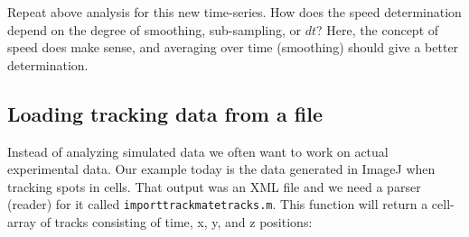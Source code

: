 Repeat above analysis for this new time-series.
How does the speed determination depend on the degree of smoothing, sub-sampling, or $dt$?
Here, the concept of speed does make sense, and averaging over time (smoothing) should give a better determination.

\subsection{Loading tracking data from a file}
Instead of analyzing simulated data we often want to work on actual experimental data.
Our example today is the data generated in ImageJ when tracking spots in cells.
That output was an XML file and we need a parser (reader) for it called \lstinline{importtrackmatetracks.m}.
This function will return a cell-array of tracks consisting of time, x, y, and z positions: